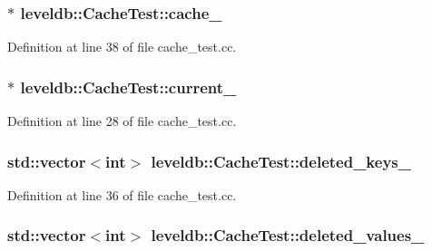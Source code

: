 \subsubsection[{cache\+\_\+}]{$\ast$ leveldb\+::\+Cache\+Test\+::cache\+\_\+}\label{classleveldb_1_1_cache_test_af2edcc8a47148050ba791f6a2b7a6165}


Definition at line 38 of file cache\+\_\+test.\+cc.

\hypertarget{classleveldb_1_1_cache_test_a91ef57f644d0531b882caed9547759f6}{}
\subsubsection[{current\+\_\+}]{ $\ast$ leveldb\+::\+Cache\+Test\+::current\+\_\+\hspace{0.3cm}{\ttfamily [static]}}\label{classleveldb_1_1_cache_test_a91ef57f644d0531b882caed9547759f6}


Definition at line 28 of file cache\+\_\+test.\+cc.

\hypertarget{classleveldb_1_1_cache_test_aad6b825748f29b973a8934682eb50ed2}{}
\subsubsection[{deleted\+\_\+keys\+\_\+}]{\setlength{\rightskip}{0pt plus 5cm}std\+::vector$<$int$>$ leveldb\+::\+Cache\+Test\+::deleted\+\_\+keys\+\_\+}\label{classleveldb_1_1_cache_test_aad6b825748f29b973a8934682eb50ed2}


Definition at line 36 of file cache\+\_\+test.\+cc.

\hypertarget{classleveldb_1_1_cache_test_add979edecc72f9740b1d6d4951c13c02}{}
\subsubsection[{deleted\+\_\+values\+\_\+}]{\setlength{\rightskip}{0pt plus 5cm}std\+::vector$<$int$>$ leveldb\+::\+Cache\+Test\+::deleted\+\_\+values\+\_\+}\label{classleveldb_1_1_cache_test_add979edecc72f9740b1d6d4951c13c02}


